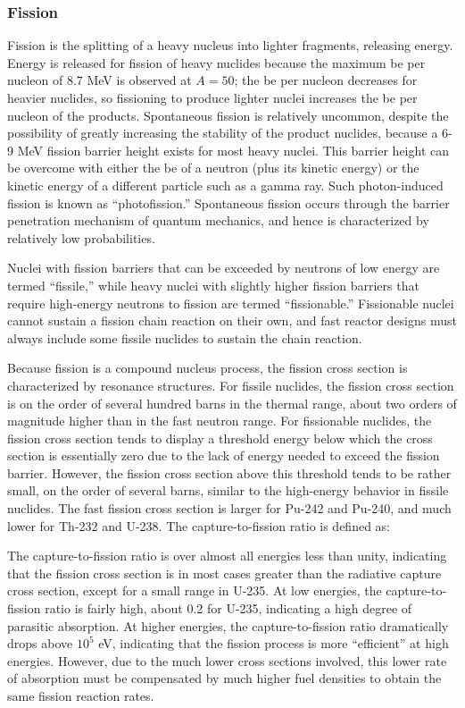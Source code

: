 \subsubsection{Fission}
Fission is the splitting of a heavy nucleus into lighter fragments, releasing energy. Energy is released for fission of heavy nuclides because the maximum \gls{be} per nucleon of 8.7 MeV is observed at \(A=50\); the \gls{be} per nucleon decreases for heavier nuclides, so fissioning to produce lighter nuclei increases the \gls{be} per nucleon of the products. Spontaneous fission is relatively uncommon, despite the possibility of greatly increasing the stability of the product nuclides, because a 6-9 MeV fission barrier height exists for most heavy nuclei. This barrier height can be overcome with either the \gls{be} of a neutron (plus its kinetic energy) or the kinetic energy of a different particle such as a gamma ray. Such photon-induced fission is known as ``photofission.'' Spontaneous fission occurs through the barrier penetration mechanism of quantum mechanics, and hence is characterized by relatively low probabilities. 

Nuclei with fission barriers that can be exceeded by neutrons of low energy are termed ``fissile,'' while heavy nuclei with slightly higher fission barriers that require high-energy neutrons to fission are termed ``fissionable.'' Fissionable nuclei cannot sustain a fission chain reaction on their own, and fast reactor designs must always include some fissile nuclides to sustain the chain reaction. %

Because fission is a compound nucleus process, the fission cross section is characterized by resonance structures. For fissile nuclides, the fission cross section is on the order of several hundred barns in the thermal range, about two orders of magnitude higher than in the fast neutron range. For fissionable nuclides, the fission cross section tends to display a threshold energy below which the cross section is essentially zero due to the lack of energy needed to exceed the fission barrier. However, the fission cross section above this threshold tends to be rather small, on the order of several barns, similar to the high-energy behavior in fissile nuclides. The fast fission cross section is larger for Pu-242 and Pu-240, and much lower for Th-232 and U-238. The capture-to-fission ratio is defined as:

\beq
\alpha\equiv{}
\eeq

The capture-to-fission ratio is over almost all energies less than unity, indicating that the fission cross section is in most cases greater than the radiative capture cross section, except for a small range in U-235. At low energies, the capture-to-fission ratio is fairly high, about 0.2 for U-235, indicating a high degree of parasitic absorption. At higher energies, the capture-to-fission ratio dramatically drops above $10^5$ eV, indicating that the fission process is more ``efficient'' at high energies. However, due to the much lower cross sections involved, this lower rate of absorption must be compensated by much higher fuel densities to obtain the same fission reaction rates.

